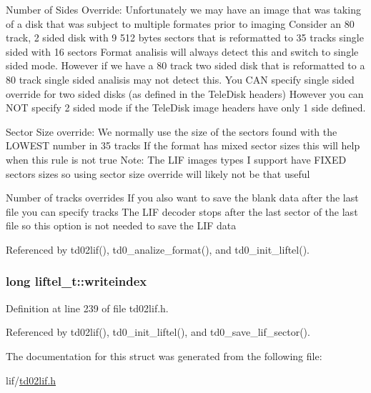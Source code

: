 Number of Sides Override\+: Unfortunately we may have an image that was taking of a disk that was subject to multiple formates prior to imaging Consider an 80 track, 2 sided disk with 9 512 bytes sectors that is reformatted to 35 tracks single sided with 16 sectors Format analisis will always detect this and switch to single sided mode. However if we have a 80 track two sided disk that is reformatted to a 80 track single sided analisis may not detect this. You C\+AN specify single sided override for two sided disks (as defined in the Tele\+Disk headers) However you can N\+OT specify 2 sided mode if the Tele\+Disk image headers have only 1 side defined.

Sector Size override\+: We normally use the size of the sectors found with the L\+O\+W\+E\+ST number in 35 tracks If the format has mixed sector sizes this will help when this rule is not true Note\+: The L\+IF images types I support have F\+I\+X\+ED sectors sizes so using sector size override will likely not be that useful

Number of tracks overrides If you also want to save the blank data after the last file you can specify tracks The L\+IF decoder stops after the last sector of the last file so this option is not needed to save the L\+IF data 

Referenced by td02lif(), td0\+\_\+analize\+\_\+format(), and td0\+\_\+init\+\_\+liftel().

\subsubsection[{\texorpdfstring{writeindex}{writeindex}}]{\setlength{\rightskip}{0pt plus 5cm}long liftel\+\_\+t\+::writeindex}\hypertarget{structliftel__t_a3c5f11408ea86ded8a0bc0d20a0ea689}{}\label{structliftel__t_a3c5f11408ea86ded8a0bc0d20a0ea689}


Definition at line 239 of file td02lif.\+h.



Referenced by td02lif(), td0\+\_\+init\+\_\+liftel(), and td0\+\_\+save\+\_\+lif\+\_\+sector().



The documentation for this struct was generated from the following file\+:\begin{DoxyCompactItemize}
\item 
lif/\hyperlink{td02lif_8h}{td02lif.\+h}\end{DoxyCompactItemize}
